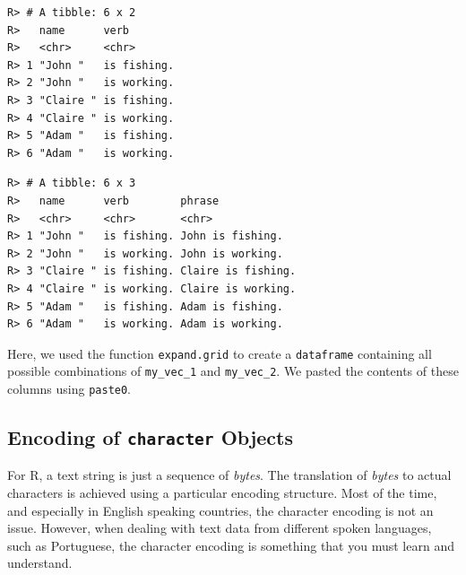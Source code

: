 \documentclass[
  12pt,
]{book}
\newenvironment{Shaded}{\begin{snugshade}}{\end{snugshade}}
\newcommand{\CommentTok}[1]{\textcolor[rgb]{0.37,0.37,0.37}{\textit{#1}}}
\newcommand{\DataTypeTok}[1]{\textcolor[rgb]{0.27,0.27,0.27}{#1}}
\newcommand{\KeywordTok}[1]{\textcolor[rgb]{0.27,0.27,0.27}{\textbf{#1}}}
\newcommand{\NormalTok}[1]{#1}
\newcommand{\OperatorTok}[1]{\textcolor[rgb]{0.43,0.43,0.43}{\textbf{#1}}}
\newcommand{\StringTok}[1]{\textcolor[rgb]{0.5,0.5,0.5}{#1}}
\begin{document}
\begin{verbatim}
R> # A tibble: 6 x 2
R>   name      verb       
R>   <chr>     <chr>      
R> 1 "John "   is fishing.
R> 2 "John "   is working.
R> 3 "Claire " is fishing.
R> 4 "Claire " is working.
R> 5 "Adam "   is fishing.
R> 6 "Adam "   is working.
\end{verbatim}

\begin{Shaded}
\end{Shaded}

\begin{verbatim}
R> # A tibble: 6 x 3
R>   name      verb        phrase            
R>   <chr>     <chr>       <chr>             
R> 1 "John "   is fishing. John is fishing.  
R> 2 "John "   is working. John is working.  
R> 3 "Claire " is fishing. Claire is fishing.
R> 4 "Claire " is working. Claire is working.
R> 5 "Adam "   is fishing. Adam is fishing.  
R> 6 "Adam "   is working. Adam is working.
\end{verbatim}

Here, we used the function \texttt{expand.grid} to create a \texttt{dataframe} containing all possible combinations of \texttt{my\_vec\_1} and \texttt{my\_vec\_2}. We pasted the contents of these columns using \texttt{paste0}.

\hypertarget{encoding-of-character-objects}{%
\subsection{\texorpdfstring{Encoding of \texttt{character} Objects}{Encoding of character Objects}}\label{encoding-of-character-objects}}

For R, a text string is just a sequence of \emph{bytes}. The translation of \emph{bytes} to actual characters is achieved using a particular encoding structure. Most of the time, and especially in English speaking countries, the character encoding is not an issue. However, when dealing with text data from different spoken languages, such as Portuguese, the character encoding is something that you must learn and understand.
\end{document}
